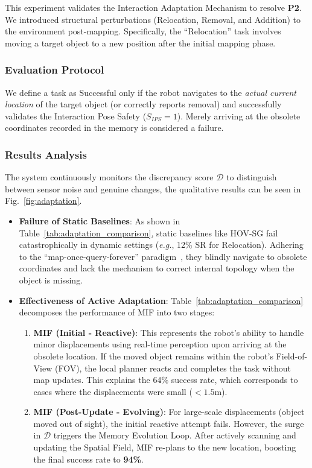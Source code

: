 \documentclass[conference]{IEEEtran}
\begin{document}
This experiment validates the Interaction Adaptation Mechanism to resolve \textbf{P2}. We introduced structural perturbations (Relocation, Removal, and Addition) to the environment post-mapping. Specifically, the ``Relocation'' task involves moving a target object to a new position after the initial mapping phase.

\subsubsection{Evaluation Protocol}
We define a task as Successful only if the robot navigates to the \textit{actual current location} of the target object (or correctly reports removal) and successfully validates the Interaction Pose Safety ($S_{IPS}=1$). Merely arriving at the obsolete coordinates recorded in the memory is considered a failure.

\subsubsection{Results Analysis}
The system continuously monitors the discrepancy score $\mathcal{D}$ to distinguish between sensor noise and genuine changes, the qualitative results can be seen in Fig.~\ref{fig:adaptation}. 

\begin{itemize}
    \item \textbf{Failure of Static Baselines}: As shown in Table~\ref{tab:adaptation_comparison}, static baselines like HOV-SG fail catastrophically in dynamic settings (\emph{e.g.}, 12\% SR for Relocation). Adhering to the ``map-once-query-forever'' paradigm~\cite{Werby-RSS-24}, they blindly navigate to obsolete coordinates and lack the mechanism to correct internal topology when the object is missing.
    
    \item \textbf{Effectiveness of Active Adaptation}: 
    Table~\ref{tab:adaptation_comparison} decomposes the performance of MIF into two stages:
    \begin{enumerate}
        \item \textbf{MIF (Initial - Reactive)}: This represents the robot's ability to handle minor displacements using real-time perception upon arriving at the obsolete location. If the moved object remains within the robot's Field-of-View (FOV), the local planner reacts and completes the task without map updates. This explains the 64\% success rate, which corresponds to cases where the displacements were small ($<1.5$m).
        \item \textbf{MIF (Post-Update - Evolving)}: For large-scale displacements (object moved out of sight), the initial reactive attempt fails. However, the surge in $\mathcal{D}$ triggers the Memory Evolution Loop. After actively scanning and updating the Spatial Field, MIF re-plans to the new location, boosting the final success rate to \textbf{94\%}.
    \end{enumerate}
\end{itemize}
\end{document}
